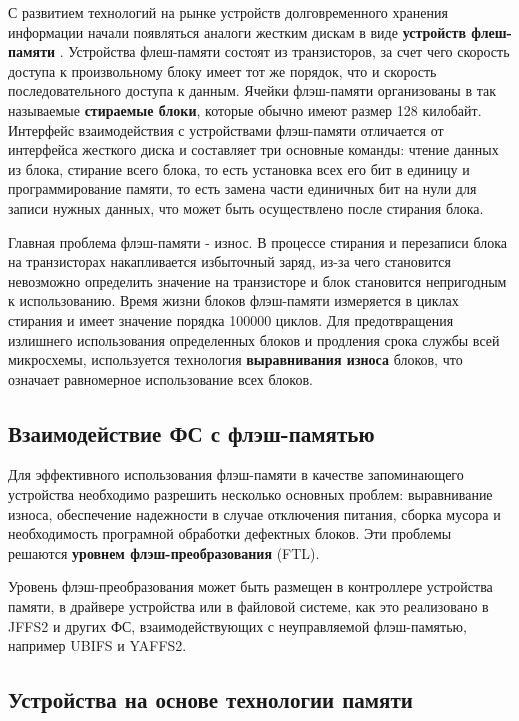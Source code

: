 С развитием технологий на рынке устройств долговременного хранения информации начали появляться аналоги жестким дискам в виде \textbf{устройств флеш-памяти} \cite{embedded}. Устройства флеш-памяти состоят из транзисторов, за счет чего скорость доступа к произвольному блоку имеет тот же порядок, что и скорость последовательного доступа к данным. Ячейки флэш-памяти организованы в так называемые \textbf{стираемые блоки}, которые обычно имеют размер 128 килобайт. Интерфейс взаимодействия с устройствами флэш-памяти отличается от интерфейса жесткого диска и составляет три основные команды: чтение данных из блока, стирание всего блока, то есть установка всех его бит в единицу и программирование памяти, то есть замена части единичных бит на нули для записи нужных данных, что может быть осуществлено после стирания блока.

Главная проблема флэш-памяти - износ. В процессе стирания и перезаписи блока на транзисторах накапливается избыточный заряд, из-за чего становится невозможно определить значение на транзисторе и блок становится непригодным к использованию. Время жизни блоков флэш-памяти измеряется в циклах стирания и имеет значение порядка 100000 циклов. Для предотвращения излишнего использования определенных блоков и продления срока службы всей микросхемы, используется технология \textbf{выравнивания износа} блоков, что означает равномерное использование всех блоков.

\subsection{Взаимодействие ФС с флэш-памятью}

Для эффективного использования флэш-памяти в качестве запоминающего устройства необходимо разрешить несколько основных проблем: выравнивание износа, обеспечение надежности в случае отключения питания, сборка мусора и необходимость програмной обработки дефектных блоков. Эти проблемы решаются \textbf{уровнем флэш-преобразования} (FTL). 

Уровень флэш-преобразования может быть размещен в контроллере устройства памяти, в драйвере устройства или в файловой системе, как это реализовано в JFFS2 и других ФС, взаимодействующих с неуправляемой флэш-памятью, например UBIFS и YAFFS2.

\subsection{Устройства на основе технологии памяти}


